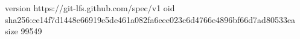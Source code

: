 version https://git-lfs.github.com/spec/v1
oid sha256:ce14f7d1448e66919e5de461a082fa6eee023c6d4766e4896bf66d7ad80533ea
size 99549
